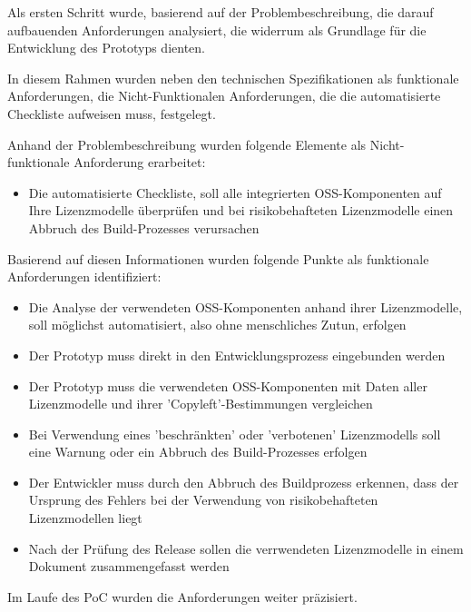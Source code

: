 
Als ersten Schritt wurde, basierend auf der Problembeschreibung, die darauf aufbauenden Anforderungen analysiert, die widerrum als Grundlage für die Entwicklung des Prototyps dienten. 

In diesem Rahmen wurden neben den technischen Spezifikationen als funktionale Anforderungen, die Nicht-Funktionalen Anforderungen, die die automatisierte Checkliste aufweisen muss, festgelegt.

Anhand der Problembeschreibung wurden folgende Elemente als Nicht-funktionale Anforderung erarbeitet: 

\begin{itemize}
    \item Die automatisierte Checkliste, soll alle integrierten OSS-Komponenten auf Ihre Lizenzmodelle überprüfen und bei risikobehafteten Lizenzmodelle einen Abbruch des Build-Prozesses verursachen
\end{itemize}

Basierend auf diesen Informationen wurden folgende Punkte als funktionale Anforderungen identifiziert: 

\begin{itemize}
    \item Die Analyse der verwendeten OSS-Komponenten anhand ihrer Lizenzmodelle, soll möglichst automatisiert, also ohne menschliches Zutun, erfolgen
    \item Der Prototyp muss direkt in den Entwicklungsprozess  eingebunden werden 
    \item Der Prototyp muss die verwendeten OSS-Komponenten mit Daten aller Lizenzmodelle und ihrer 'Copyleft'-Bestimmungen vergleichen 
    \item Bei Verwendung eines 'beschränkten' oder 'verbotenen' Lizenzmodells soll eine Warnung oder ein Abbruch des Build-Prozesses erfolgen      
    \item Der Entwickler muss durch den Abbruch des Buildprozess erkennen, dass der Ursprung des Fehlers bei der Verwendung von risikobehafteten Lizenzmodellen liegt
    \item Nach der Prüfung des Release sollen die verrwendeten Lizenzmodelle in einem Dokument zusammengefasst werden
\end{itemize}

Im Laufe des PoC wurden die Anforderungen weiter präzisiert.


